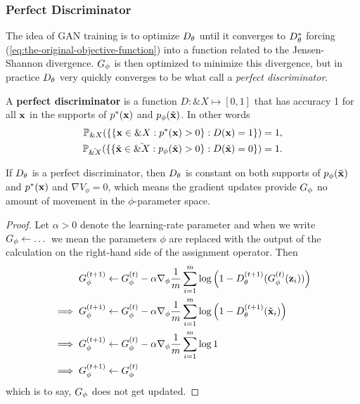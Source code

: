 
\subsubsection*{Perfect Discriminator}

The idea of GAN training is to optimize $D_\theta$ until it converges to
$D_\theta^*$ forcing (\ref{eq:the-original-objective-function}) into a
function related to the Jensen-Shannon divergence.  $G_\phi$ is then
optimized to minimize this divergence, but in practice $D_\theta$ very
quickly converges to be what \cite{ref:arjovsky-towards-2017} call a
\textit{perfect discriminator}.

\begin{definition} A \textbf{perfect discriminator} is a function $D:
  \&X \mapsto [0,1]$ that has accuracy 1 for all $\mathbf{x}$ in the supports
  of $p^*(\mathbf{x})$ and $p_{\phi}(\tilde{\mathbf{x}})$. In other words
  \begin{align} \mathbb{P}_{\&X}(\{\{\mathbf{x} \in \&X : p^*(\mathbf{x}) > 0\} : D(\mathbf{x})
    = 1 \} )= 1, \\ \mathbb{P}_{\tilde{\&X}}(\{\{\tilde{\mathbf{x}} \in
    \tilde{\&X} : p_{\phi}(\tilde{\mathbf{x}}) > 0\} : D(\tilde{\mathbf{x}}) = 0 \} )= 1.
  \end{align}
\end{definition}

\begin{theorem} If $D_\theta$ is a perfect discriminator, then $D_\theta$ is
  constant on both supports of $p_{\phi}(\tilde{\mathbf{x}})$ and $p^*(\mathbf{x})$ and $\nabla{V_\phi} = 0$,
  which means the gradient updates provide $G_\phi$ no amount of movement in
  the $\phi$-parameter space.
\end{theorem}

\begin{proof} Let $\alpha>0$ denote the learning-rate parameter and
  when we write $G_\phi \gets \dots$ we mean the parameters $\phi$ are
  replaced with the output of the calculation on the right-hand side of
  the assignment operator. Then
  \begin{align}
    \label{eq:g-updates-no-good}
    G_\phi^{(t+1)} & \gets G_\phi^{(t)} -
                 \alpha\nabla_\phi {1 \over m} \sum_{i=1}^m \log\left( 1 -
                 D_\theta^{(t+1)}(G_\phi^{(t)}(\mathbf{z}_i)) \right) \\
    \implies G_\phi^{(t+1)} & \gets
                          G_\phi^{(t)} - \alpha\nabla_\phi {1 \over m} \sum_{i=1}^m \log{ \left( 1 -
                          D_\theta^{(t+1)}(\tilde{\mathbf{x}}_i) \right)} \\ \implies
    G_\phi^{(t+1)}
               & \gets
                 G_\phi^{(t)} - \alpha\nabla_\phi {1 \over m} \sum_{i=1}^m \log{1} \\
    \implies G_\phi^{(t+1)}
               & \gets G_\phi^{(t)}
  \end{align} which is to say, $G_\phi$ does not get updated.
\end{proof}

